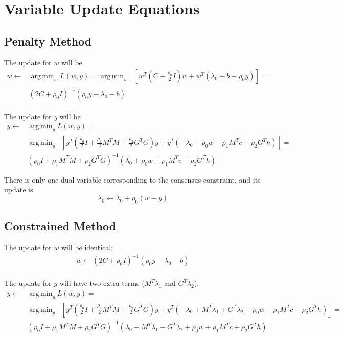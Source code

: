 \documentclass{article}
\DeclareMathOperator*{\argmin}{arg\,min}
\begin{document}
\section{Variable Update Equations}

\subsection{Penalty Method}

The update for $w$ will be
\begin{align*}
w \leftarrow
&\argmin_w L(w, y) = \argmin_w \;\; [w^T (C + \frac{\rho_0}{2} I) w + w^T (\lambda_0 + b - \rho_0 y)] = \\
&(2C + \rho_0 I)^{-1} (\rho_0 y - \lambda_0 - b)\\
\end{align*}

The update for $y$ will be
\begin{align*}
y \leftarrow
&\argmin_y L(w, y) = \\
&\argmin_y \;\; [y^T (\frac{\rho_0}{2} I + \frac{\rho_1}{2} M^T M + \frac{\rho_2}{2} G^T G) y + y^T (-\lambda_0 - \rho_0 w - \rho_1 M^T c - \rho_2 G^T h)] = \\
&(\rho_0 I + \rho_1 M^T M + \rho_2 G^T G)^{-1}(\lambda_0 + \rho_0 w + \rho_1 M^T c + \rho_2 G^T h)
\end{align*}

There is only one dual variable corresponding to the consensus constraint, and its update is
\[
\lambda_0 \leftarrow \lambda_0 + \rho_0 (w - y)
\]

\subsection{Constrained Method}

The update for $w$ will be identical:
\begin{align*}
w \leftarrow (2C + \rho_0 I)^{-1} (\rho_0 y - \lambda_0 - b)\\
\end{align*}

The update for $y$ will have two extra terms ($M^T \lambda_1$ and $G^T \lambda_2$):
\begin{align*}
y \leftarrow
&\argmin_y L(w, y) = \\
&\argmin_y \;\; [y^T (\frac{\rho_0}{2} I + \frac{\rho_1}{2} M^T M + \frac{\rho_2}{2} G^T G) y + y^T (-\lambda_0 + M^T \lambda_1 + G^T \lambda_2 - \rho_0 w - \rho_1 M^T c - \rho_2 G^T h)] = \\
&(\rho_0 I + \rho_1 M^T M + \rho_2 G^T G)^{-1}(\lambda_0 - M^T \lambda_1 - G^T \lambda_2 + \rho_0 w + \rho_1 M^T c + \rho_2 G^T h)
\end{align*}
\end{document}
